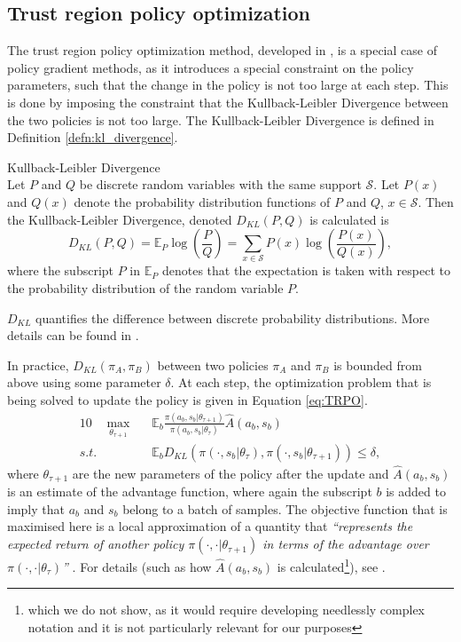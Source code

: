 \newpage
\subsection{Trust region policy optimization}
The trust region policy optimization method, developed in \cite{TRPO}, is a special case of policy gradient methods, as it introduces a special constraint on the policy parameters, such that the change in the policy is not too large at each step. This is done by imposing the constraint that the Kullback-Leibler Divergence between the two policies is not too large. The Kullback-Leibler Divergence is defined in Definition \ref{defn:kl_divergence}.
\begin{defn} \label{defn:kl_divergence}
{\normalfont Kullback-Leibler Divergence}
\\
Let $P$ and $Q$ be discrete random variables with the same support $\mathcal{S}$. Let $P(x)$ and $Q(x)$ denote the probability distribution functions of $P$ and $Q$, $x \in \mathcal{S}$. Then the Kullback-Leibler Divergence, denoted $D_{KL}(P,Q)$ is calculated is
\begin{equation*}
D_{KL}(P,Q) = \mathbb{E}_{P} \log(\frac{P}{Q}) = \sum_{x \in \mathcal{S}} P(x) \log(\frac{P(x)}{Q(x)}),	
\end{equation*}
where the subscript $P$ in $\mathbb{E}_{P}$ denotes that the expectation is taken with respect to the probability distribution of the random variable $P$.
\end{defn}
$D_{KL}$ quantifies the difference between discrete probability distributions. More details can be found in \cite{KL_divergence}.

In practice, $D_{KL}(\pi_{A},\pi_{B})$ between two policies $\pi_{A}$ and $\pi_{B}$ is bounded from above using some parameter $\delta$. At each step, the optimization problem that is being solved to update the policy is given in Equation \ref{eq:TRPO}.
\begin{alignat}{10}
&  \underset{\theta_{\tau+1}}{\max} \, && \mathbb{E}_b \frac{\pi(a_b, s_b|\theta_{\tau+1})}{\pi(a_b, s_b|\theta_{\tau})} \widehat{A}(a_b, s_b) \label{eq:TRPO} \\
s.t. & && \mathbb{E}_b D_{KL}(\pi(\cdot, s_b|\theta_{\tau}), \pi(\cdot, s_b|\theta_{\tau+1})) \leq \delta \nonumber,
\end{alignat}
where $\theta_{\tau+1}$ are the new parameters of the policy after the update and $\widehat{A}(a_b, s_b)$ is an estimate of the advantage function, where again the subscript $b$ is added to imply that $a_b$ and $s_b$ belong to a batch of samples.
The objective function that is maximised here is a local approximation of a quantity that \textit{“represents the expected return
of another policy $\pi(\cdot,\cdot|\theta_{\tau+1})$ in terms of the advantage over $\pi(\cdot,\cdot|\theta_{\tau})$”} \cite[Equation 1]{TRPO}. For details (such as how $\widehat{A}(a_b, s_b)$ is calculated\footnote{which we do not show, as it would require developing needlessly complex notation and it is not particularly relevant for our purposes}), see \cite[Section 2-4]{TRPO}.

